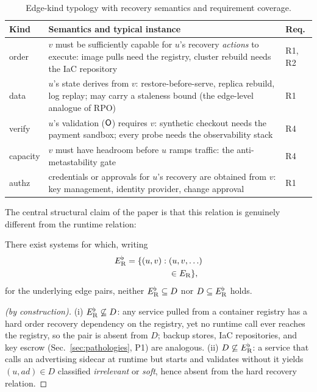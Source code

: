 \begin{table}[t]
\centering\small
\caption{Edge-kind typology with recovery semantics and requirement coverage.}
\label{tab:kinds}
\begin{tabularx}{\textwidth}{@{}l X l@{}}
\toprule
\textbf{Kind} & \textbf{Semantics and typical instance} & \textbf{Req.} \\
\midrule
\textsf{order} & $v$ must be sufficiently capable for $u$'s recovery \emph{actions} to execute: image pulls need the registry, cluster rebuild needs the IaC repository & R1, R2 \\
\textsf{data} & $u$'s state derives from $v$: restore-before-serve, replica rebuild, log replay; may carry a staleness bound (the edge-level analogue of RPO) & R1 \\
\textsf{verify} & $u$'s validation ($\mathsf{O}$) requires $v$: synthetic checkout needs the payment sandbox; every probe needs the observability stack & R4 \\
\textsf{capacity} & $v$ must have headroom before $u$ ramps traffic: the anti-metastability gate \citep{bronson2021metastable} & R4 \\
\textsf{authz} & credentials or approvals for $u$'s recovery are obtained from $v$: key management, identity provider, change approval & R1 \\
\bottomrule
\end{tabularx}
\end{table}

The central structural claim of the paper is that this relation is genuinely different from the runtime relation:

\begin{proposition}[Incomparability]
\label{prop:incomparable}
There exist systems for which, writing
\[
\begin{aligned}
E_{\mathrm{R}}^{\flat}=\{(u,v) : {} & (u,v,\ldots) \\
                          & \in E_{\mathrm{R}}\},
\end{aligned}
\]
for the underlying edge pairs, neither $E_{\mathrm{R}}^{\flat} \subseteq D$ nor $D \subseteq E_{\mathrm{R}}^{\flat}$ holds.
\end{proposition}

\begin{proof}[(by construction)]
(i) $E_{\mathrm{R}}^{\flat} \not\subseteq D$: any service pulled from a container registry has a hard \textsf{order} recovery dependency on the registry, yet no runtime call ever reaches the registry, so the pair is absent from $D$; backup stores, IaC repositories, and key escrow (Sec.~\ref{sec:pathologies}, P1) are analogous. (ii) $D \not\subseteq E_{\mathrm{R}}^{\flat}$: a service that calls an advertising sidecar at runtime but starts and validates without it yields $(u,\textit{ad}) \in D$ classified \emph{irrelevant} or \emph{soft}, hence absent from the hard recovery relation. \qedhere
\end{proof}

